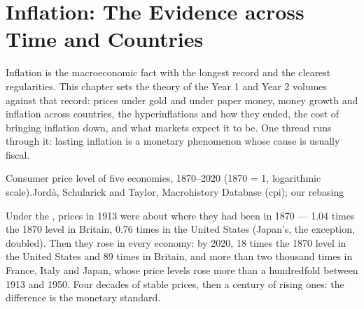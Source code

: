 \chapter{Inflation: The Evidence across Time and Countries}\label{ch:b3:inflation-evidence}

Inflation is the macroeconomic fact with the longest record and the clearest
regularities. This chapter sets the theory of the Year 1 and Year 2 volumes against
that record: prices under gold and under paper money, money growth and inflation
across countries, the hyperinflations and how they ended, the cost of bringing
inflation down, and what markets expect it to be. One thread runs through it:
lasting inflation is a monetary phenomenon whose cause is usually fiscal.

\begin{openingchart}{Consumer price level of five economies, 1870--2020 (1870 = 1,
logarithmic scale).}{Jordà, Schularick and Taylor, Macrohistory Database (cpi); our
rebasing}
\end{openingchart}

Under the , prices in 1913 were about where they had been in 1870 ---
1.04 times the 1870 level in Britain, 0.76 times in the United States (Japan's, the
exception, doubled). Then they
rose in every economy: by 2020, 18 times the 1870 level in the United States and 89
times in Britain, and more than two thousand times in France, Italy and Japan,
whose price levels rose more than a hundredfold between 1913 and 1950. Four decades of stable prices, then a century of
rising ones: the difference is the monetary standard.

